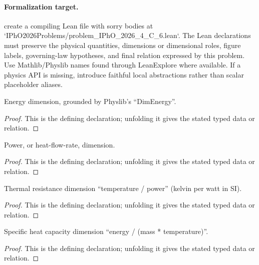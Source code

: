 \paragraph{Formalization target.}
create a compiling Lean file with sorry bodies at `IPhO2026Problems/problem\_IPhO\_2026\_4\_C\_6.lean`. The Lean declarations must preserve the physical quantities, dimensions or dimensional roles, figure labels, governing-law hypotheses, and final relation expressed by this problem.
Use Mathlib/Physlib names found through LeanExplore where available. If a physics API is missing, introduce faithful local abstractions rather than scalar placeholder aliases.

\begin{definition}[energyDimension]
  \label{decl:physics:IPhO_2026_4_C_6:energyDimension}
  Energy dimension, grounded by Physlib's “DimEnergy”.
\end{definition}
\begin{proof}
  This is the defining declaration; unfolding it gives the stated typed data or relation.
\end{proof}

\begin{definition}[powerDimension]
  \label{decl:physics:IPhO_2026_4_C_6:powerDimension}
  Power, or heat-flow-rate, dimension.
\end{definition}
\begin{proof}
  This is the defining declaration; unfolding it gives the stated typed data or relation.
\end{proof}

\begin{definition}[thermalResistanceDimension]
  \label{decl:physics:IPhO_2026_4_C_6:thermalResistanceDimension}
  Thermal resistance dimension “temperature / power” (kelvin per watt in SI).
\end{definition}
\begin{proof}
  This is the defining declaration; unfolding it gives the stated typed data or relation.
\end{proof}

\begin{definition}[specificHeatCapacityDimension]
  \label{decl:physics:IPhO_2026_4_C_6:specificHeatCapacityDimension}
  Specific heat capacity dimension “energy / (mass * temperature)”.
\end{definition}
\begin{proof}
  This is the defining declaration; unfolding it gives the stated typed data or relation.
\end{proof}

